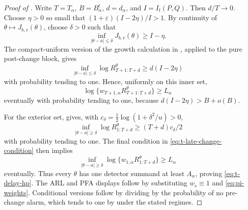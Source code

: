 \documentclass[12pt]{article}
\theoremstyle{spaced}
\theoremstyle{remark}
\begin{document}
\begin{proof}[Proof of ]
Write $T=T_\alpha$, $B=B_\alpha^t$, $d=d_\alpha$, and $I=I_t(P,Q)$.
Then $d/T\to0$.  Choose $\eta>0$ so small that
$(1+\varepsilon)(I-2\eta)/I>1$.  By continuity of
$\theta\mapsto J_{b,v}(\theta)$, choose $\delta>0$ such that
\[
  \inf_{|\theta-a|\le\delta}J_{b,v}(\theta)\ge I-\eta.
\]
The compact-uniform version of the growth calculation in
, applied to the pure post-change block, gives
\[
  \inf_{|\theta-a|\le\delta}
  \log R_{T+1:T+d}^{\theta}
  \ge d(I-2\eta)
\]
with probability tending to one.  Hence, uniformly on this inner set,
\[
  \log\{w_{T+1,\alpha}R_{T+1:T+d}^{\theta}\}
  \ge L_\alpha
\]
eventually with probability tending to one, because
$d(I-2\eta)>B+o(B)$.

For the exterior set,  gives, with
$c_\delta=\frac12\log(1+\delta^2/u)>0$,
\[
  \inf_{|\theta-a|\ge\delta}
  \log R_{1:T+d}^{\theta}
  \ge (T+d)c_\delta/2
\]
with probability tending to one.  The final condition in
\eqref{eq:t-late-change-condition} then implies
\[
  \inf_{|\theta-a|\ge\delta}
  \log\{w_{1,\alpha}R_{1:T+d}^{\theta}\}
  \ge L_\alpha
\]
eventually.  Thus every $\theta$ has one detector summand at least
$A_\alpha$, proving \eqref{eq:t-delay-hp}.  The ARL and PFA displays follow
by substituting $w_s\equiv1$ and \eqref{eq:pi-weights}.  Conditional versions
follow by dividing by the probability of no pre-change alarm, which tends to
one by  under the stated regimes.
\end{proof}
\end{document}
